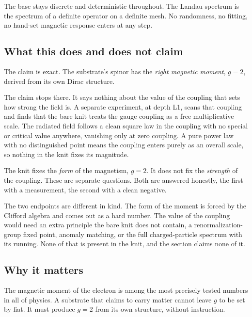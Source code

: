The base stays discrete and deterministic throughout. The Landau spectrum is the spectrum of a definite operator on a definite mesh. No randomness, no fitting, no hand-set magnetic response enters at any step.

\subsection{What this does and does not claim}

The claim is exact. The substrate's spinor has the \emph{right magnetic moment}, $g = 2$, derived from its own Dirac structure.

The claim stops there. It says nothing about the value of the coupling that sets how strong the field is. A separate experiment, at depth L1, scans that coupling and finds that the bare knit treats the gauge coupling as a free multiplicative scale. The radiated field follows a clean square law in the coupling with no special or critical value anywhere, vanishing only at zero coupling. A pure power law with no distinguished point means the coupling enters purely as an overall scale, so nothing in the knit fixes its magnitude.

\begin{principle}
The knit fixes the \emph{form} of the magnetism, $g = 2$. It does not fix the \emph{strength} of the coupling. These are separate questions. Both are answered honestly, the first with a measurement, the second with a clean negative.
\end{principle}

The two endpoints are different in kind. The form of the moment is forced by the Clifford algebra and comes out as a hard number. The value of the coupling would need an extra principle the bare knit does not contain, a renormalization-group fixed point, anomaly matching, or the full charged-particle spectrum with its running. None of that is present in the knit, and the section claims none of it.

\subsection{Why it matters}

The magnetic moment of the electron is among the most precisely tested numbers in all of physics. A substrate that claims to carry matter cannot leave $g$ to be set by fiat. It must produce $g = 2$ from its own structure, without instruction.

